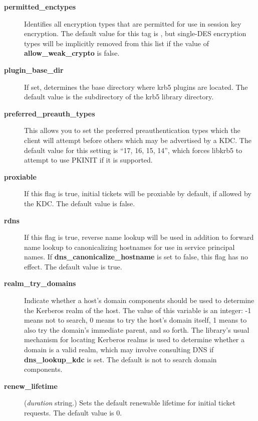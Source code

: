 \documentclass[letterpaper,10pt,english]{sphinxmanual}
\begin{document}
\begin{description}
\item[{\textbf{permitted\_enctypes}}] \leavevmode
Identifies all encryption types that are permitted for use in
session key encryption.  The default value for this tag is
, but single-DES encryption types will be implicitly
removed from this list if the value of \textbf{allow\_weak\_crypto} is
false.

\item[{\textbf{plugin\_base\_dir}}] \leavevmode
If set, determines the base directory where krb5 plugins are
located.  The default value is the  subdirectory
of the krb5 library directory.

\item[{\textbf{preferred\_preauth\_types}}] \leavevmode
This allows you to set the preferred preauthentication types which
the client will attempt before others which may be advertised by a
KDC.  The default value for this setting is ``17, 16, 15, 14'',
which forces libkrb5 to attempt to use PKINIT if it is supported.

\item[{\textbf{proxiable}}] \leavevmode
If this flag is true, initial tickets will be proxiable by
default, if allowed by the KDC.  The default value is false.

\item[{\textbf{rdns}}] \leavevmode
If this flag is true, reverse name lookup will be used in addition
to forward name lookup to canonicalizing hostnames for use in
service principal names.  If \textbf{dns\_canonicalize\_hostname} is set
to false, this flag has no effect.  The default value is true.

\item[{\textbf{realm\_try\_domains}}] \leavevmode
Indicate whether a host's domain components should be used to
determine the Kerberos realm of the host.  The value of this
variable is an integer: -1 means not to search, 0 means to try the
host's domain itself, 1 means to also try the domain's immediate
parent, and so forth.  The library's usual mechanism for locating
Kerberos realms is used to determine whether a domain is a valid
realm, which may involve consulting DNS if \textbf{dns\_lookup\_kdc} is
set.  The default is not to search domain components.

\item[{\textbf{renew\_lifetime}}] \leavevmode
(\emph{duration} string.)  Sets the default renewable lifetime
for initial ticket requests.  The default value is 0.


\end{description}
\end{document}
